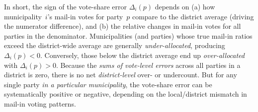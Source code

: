 \documentclass[12pt]{article}
\begin{document}
\noindent
In short, the sign of the vote-share error \(\Delta_i(p)\) depends on (a) how municipality~\(i\)’s mail-in votes for party~\(p\) compare to the district average (driving the numerator difference), and (b) the relative changes in mail-in votes for all parties in the denominator. Municipalities (and parties) whose true mail-in ratios exceed the district-wide average are generally \emph{under-allocated}, producing \(\Delta_i(p)<0\). Conversely, those below the district average end up \emph{over-allocated} with \(\Delta_i(p)>0\). Because the \emph{sums of vote-level errors} across all parties in a district is zero, there is no net \emph{district-level} over- or undercount. But for any single party \emph{in a particular municipality}, the vote-share error can be systematically positive or negative, depending on the local/district mismatch in mail-in voting patterns.
\end{document}
